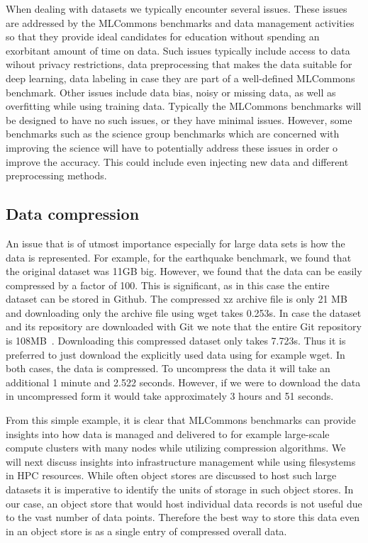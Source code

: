 \documentclass[utf8]{FrontiersinVancouver} %
\begin{document}
When dealing with datasets we typically encounter several issues.
These issues are addressed by the MLCommons benchmarks and
data management activities so that they provide ideal candidates for
education without spending an exorbitant amount of time on data. Such
issues typically include access to data wihout privacy restrictions,
data preprocessing that makes the data suitable for deep learning,
data labeling in case they are part of a well-defined MLCommons
benchmark. Other issues include data bias, noisy or missing data, as
well as overfitting while using training data. Typically the MLCommons
benchmarks will be designed to have no such issues, or they have
minimal issues. However, some benchmarks such as the science group
benchmarks which are concerned with improving the science will have to
potentially address these issues in order o improve the accuracy. This
could include even injecting new data and different preprocessing
methods.


\subsection{Data compression}

An issue that is of utmost importance especially for large data sets
is how the data is represented. For example, for the earthquake
benchmark, we found that the original dataset was 11GB big. However,
we found that the data can be easily compressed by a factor of
100. This is significant, as in this case the entire dataset can be
stored in Github. The compressed xz archive file is only 21 MB and
downloading only the archive file using wget takes 0.253s. In case the
dataset and its repository are downloaded with Git we note that the
entire Git repository is
108MB~\citep{mlcommons-earthquake-data}. Downloading this compressed
dataset only takes 7.723s. Thus it is preferred to just download the
explicitly used data using for example wget. In both cases, the data
is compressed. To uncompress the data it will take an additional 1
minute and 2.522 seconds. However, if we were to download the data in
uncompressed form it would take approximately 3 hours and 51 seconds.

From this simple example, it is clear that MLCommons benchmarks can
provide insights into how data is managed and delivered to for example
large-scale compute clusters with many nodes while utilizing
compression algorithms. We will next discuss insights into
infrastructure management while using filesystems in HPC resources.
While often object stores are discussed to host such large datasets it
is imperative to identify the units of storage in such object stores.
In our case, an object store that would host individual data records is
not useful due to the vast number of data points. Therefore the best
way to store this data even in an object store is as a single entry of
compressed overall data.
\end{document}
